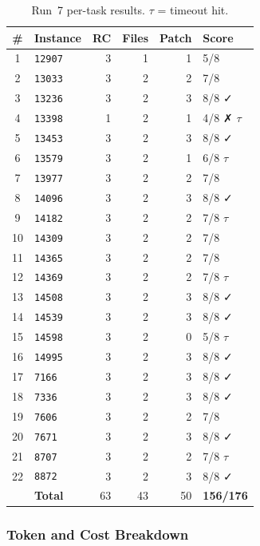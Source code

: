 \begin{table}[h]
\centering
\small
\caption{Run~7 per-task results.  $\tau$ = timeout hit.}\label{tab:r7-tasks}
\setlength{\tabcolsep}{4pt}
\begin{tabular}{clrrrl}
\toprule
\textbf{\#} & \textbf{Instance} & \textbf{RC} & \textbf{Files} & \textbf{Patch} & \textbf{Score} \\
\midrule
 1 & \texttt{12907} & 3 & 1 & 1 & 5/8 \\
 2 & \texttt{13033} & 3 & 2 & 2 & 7/8 \\
 3 & \texttt{13236} & 3 & 2 & 3 & 8/8 ✓ \\
 4 & \texttt{13398} & 1 & 2 & 1 & 4/8 ✗ $\tau$ \\
 5 & \texttt{13453} & 3 & 2 & 3 & 8/8 ✓ \\
 6 & \texttt{13579} & 3 & 2 & 1 & 6/8 $\tau$ \\
 7 & \texttt{13977} & 3 & 2 & 2 & 7/8 \\
 8 & \texttt{14096} & 3 & 2 & 3 & 8/8 ✓ \\
 9 & \texttt{14182} & 3 & 2 & 2 & 7/8 $\tau$ \\
10 & \texttt{14309} & 3 & 2 & 2 & 7/8 \\
11 & \texttt{14365} & 3 & 2 & 2 & 7/8 \\
12 & \texttt{14369} & 3 & 2 & 2 & 7/8 $\tau$ \\
13 & \texttt{14508} & 3 & 2 & 3 & 8/8 ✓ \\
14 & \texttt{14539} & 3 & 2 & 3 & 8/8 ✓ \\
15 & \texttt{14598} & 3 & 2 & 0 & 5/8 $\tau$ \\
16 & \texttt{14995} & 3 & 2 & 3 & 8/8 ✓ \\
17 & \texttt{7166}  & 3 & 2 & 3 & 8/8 ✓ \\
18 & \texttt{7336}  & 3 & 2 & 3 & 8/8 ✓ \\
19 & \texttt{7606}  & 3 & 2 & 2 & 7/8 \\
20 & \texttt{7671}  & 3 & 2 & 3 & 8/8 ✓ \\
21 & \texttt{8707}  & 3 & 2 & 2 & 7/8 $\tau$ \\
22 & \texttt{8872}  & 3 & 2 & 3 & 8/8 ✓ \\
\midrule
   & \textbf{Total} & 63 & 43 & 50 & \textbf{156/176} \\
\bottomrule
\end{tabular}
\end{table}

\subsubsection{Token and Cost Breakdown}


